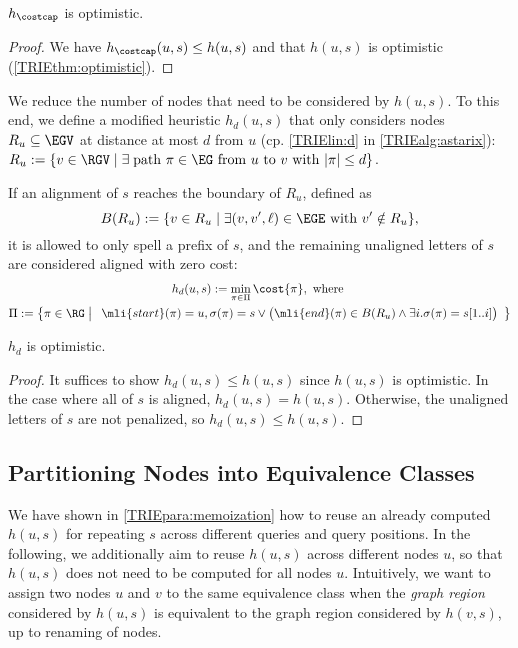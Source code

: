 \begin{samepage}
	\begin{thm} \label{TRIEthm:hbar_optimistic}
		$h_{\costcap}$ is optimistic.
	\end{thm}
	\begin{proof}
		We have $h_\costcap(u,s) \leq h(u,s)$ and that $h(u,s)$ is
		optimistic (\cref{TRIEthm:optimistic}).
	\end{proof}
	\end{samepage}

We reduce the number of nodes that need to be considered by $h(u,s)$. To this
end, we define a modified heuristic $h_d(u,s)$ that only considers nodes $R_u
\subseteq \EGV$ at distance at most $d$ from $u$ (cp. \cref{TRIElin:d} in
\cref{TRIEalg:astarix}):
$
R_u := \{ v \in \RGV \mid \exists \; \text{path } \pi \in \EG \text{ from } u \text{ to } v \text{ with } \lvert \pi \rvert \leq d \}
$.

If an alignment of $s$ reaches the boundary of $R_u$, defined as $$B(R_u) := \{v
\in R_u \mid \exists (v,v',\ell) \in \EGE \text{ with } v' \notin R_u \},$$ it is
allowed to only spell a prefix of $s$, and the remaining unaligned letters of
$s$ are considered aligned with zero cost:
\begin{gather*}
h_d(u,s) := \min_{\pi \in \Pi} \cost{\pi}, \text{ where } \\
\Pi := \left\{ \pi \in \RG \;\middle|\; \begin{array}{c}
\mli{start}(\pi)=u, 
\sigma(\pi)=s \lor \big(\mli{end}(\pi)\in B(R_u) \land \exists i. \sigma(\pi)=s[1..i] \big)
\end{array}
\right\}
\end{gather*}

\begin{samepage}
\begin{thm} \label{TRIEthm:hbar_optimistic}
	$h_d$ is optimistic.
\end{thm}
\begin{proof}
It suffices to show $h_d(u,s) \leq h(u, s)$ since $h(u, s)$ is optimistic. In
the case where all of $s$ is aligned, $h_d(u,s) = h(u, s)$. Otherwise, the
unaligned letters of $s$ are not penalized, so $h_d(u,s) \leq h(u, s)$.
\end{proof}
\end{samepage}


\subsection{Partitioning Nodes into Equivalence Classes} \label{TRIEsubsec:partition}
We have shown in \cref{TRIEpara:memoization} how to reuse an already computed
$h(u,s)$ for repeating $s$ across different queries and query positions. In the
following, we additionally aim to reuse $h(u,s)$ across different nodes $u$, so
that $h(u,s)$ does not need to be computed for all nodes $u$. Intuitively, we
want to assign two nodes $u$ and $v$ to the same equivalence class when the
\emph{graph region} considered by $h(u,s)$ is equivalent to the graph region
considered by $h(v,s)$, up to renaming of nodes.

